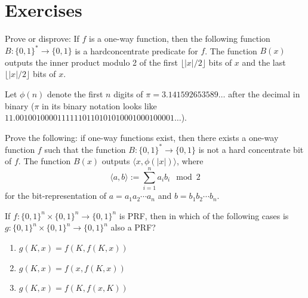 \documentclass[12pt]{tufte-book}
\begin{document}
\newpage
\section*{Exercises}
\begin{exercise}
    \newcommand{\bit}{\{0,1\}}

    Prove or disprove: If $f$ is a one-way function, then the following function $B:\bit^*\to\bit$ is a hardconcentrate predicate for $f$. The function $B(x)$ outputs the inner product modulo 2 of the first $\lfloor |x|/2\rfloor$ bits of $x$ and the last $\lfloor |x|/2\rfloor$ bits of $x$.
\end{exercise}

\begin{exercise}
    Let $\phi(n)$ denote the first $n$ digits of $\pi = 3.141592653589\ldots$ after the decimal in binary ($\pi$ in its binary notation looks like $11.00100100001111110110101010001000100001\ldots$).

    Prove the following: if one-way functions exist, then there exists a one-way function $f$ such that the function $B:\{0,1\}^* \rightarrow \{0,1\}$ is not a hard concentrate bit of $f$. The function $B(x)$ outputs $\langle x, \phi(|x|)\rangle$, where
    \[\langle a, b\rangle := \sum_{i=1}^n a_i b_i \mod 2\]
    for the bit-representation of $a = {a_1a_2\cdots a_n}$ and $b= {b_1b_2\cdots b_n}$.
\end{exercise}

\begin{exercise}
    If $f: \{0,1\}^{n}\times \{0,1\}^n\rightarrow \{0,1\}^n$  is PRF, then in which of the following cases is $g: \{0,1\}^{n}\times \{0,1\}^n\rightarrow \{0,1\}^n$ also a PRF? \begin{enumerate} \item $g(K,x) = f(K,f(K,x))$ \item $g(K,x) = f(x,f(K,x))$ \item $g(K,x) = f(K,f(x,K))$
    \end{enumerate}
\end{exercise}
\end{document}
